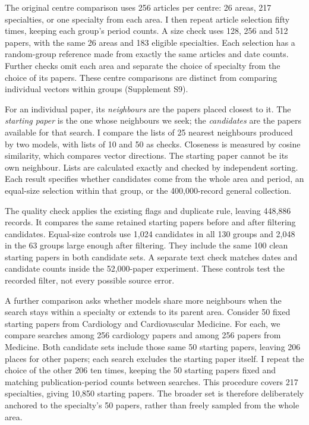 \documentclass[12pt]{article}
\begin{document}
The original centre comparison uses 256 articles per centre: 26 areas, 217 specialties, or one specialty from each area. I then repeat article selection fifty times, keeping each group's period counts. A size check uses 128, 256 and 512 papers, with the same 26 areas and 183 eligible specialties. Each selection has a random-group reference made from exactly the same articles and date counts. Further checks omit each area and separate the choice of specialty from the choice of its papers. These centre comparisons are distinct from comparing individual vectors within groups (Supplement S9).

For an individual paper, its \emph{neighbours} are the papers placed closest to it. The \emph{starting paper} is the one whose neighbours we seek; the \emph{candidates} are the papers available for that search. I compare the lists of 25 nearest neighbours produced by two models, with lists of 10 and 50 as checks. Closeness is measured by cosine similarity, which compares vector directions. The starting paper cannot be its own neighbour. Lists are calculated exactly and checked by independent sorting. Each result specifies whether candidates come from the whole area and period, an equal-size selection within that group, or the 400,000-record general collection.

The quality check applies the existing flags and duplicate rule, leaving 448,886 records. It compares the same retained starting papers before and after filtering candidates. Equal-size controls use 1,024 candidates in all 130 groups and 2,048 in the 63 groups large enough after filtering. They include the same 100 clean starting papers in both candidate sets. A separate text check matches dates and candidate counts inside the 52,000-paper experiment. These controls test the recorded filter, not every possible source error.

A further comparison asks whether models share more neighbours when the search stays within a specialty or extends to its parent area. Consider 50 fixed starting papers from Cardiology and Cardiovascular Medicine. For each, we compare searches among 256 cardiology papers and among 256 papers from Medicine. Both candidate sets include those same 50 starting papers, leaving 206 places for other papers; each search excludes the starting paper itself. I repeat the choice of the other 206 ten times, keeping the 50 starting papers fixed and matching publication-period counts between searches. This procedure covers 217 specialties, giving 10,850 starting papers. The broader set is therefore deliberately anchored to the specialty's 50 papers, rather than freely sampled from the whole area.
\end{document}
